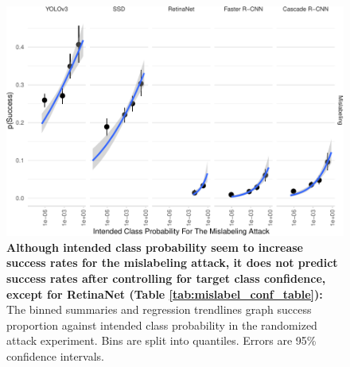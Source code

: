 \begin{figure}[tb]

{\centering \includegraphics{rmd_imgs/mislabel_conf_graph-1} 

}

\caption{\textbf{Although intended class probability seem to increase success rates for the mislabeling attack, it does not predict success rates after controlling for target class confidence, except for RetinaNet (Table \ref{tab:mislabel_conf_table}):}  The binned summaries and regression trendlines graph success proportion against intended class probability in the randomized attack experiment. Bins are split into quantiles. Errors are 95\% confidence intervals. }\label{fig:mislabel_conf_graph}
\end{figure}

\begingroup\fontsize{9}{11}\selectfont

